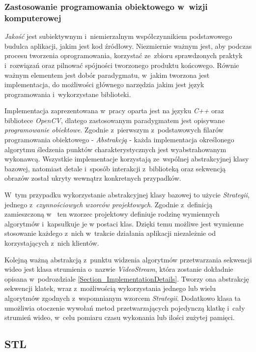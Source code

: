       \subsubsection{Zastosowanie programowania obiektowego w~wizji komputerowej}

        \textit{Jakość} jest subiektywnym i~niemierzalnym współczynnikiem podstawowego budulca aplikacji, jakim jest kod źródłowy. Niezmiernie ważnym jest, aby podczas procesu tworzenia oprogramowania, korzystać ze~zbioru sprawdzonych praktyk i~rozwiązań oraz pilnować spójności tworzonego produktu końcowego. Równie ważnym elementem jest dobór paradygmatu, w~jakim tworzona jest implementacja, do możliwości głównego narzędzia jakim jest język programowania i~wykorzystane biblioteki.

        Implementacja zaprezentowana w~pracy oparta jest na języku \textit{C++} oraz bibliotece \textit{OpenCV}, dlatego zastosowanym paradygmatem jest opisywane \textit{programowanie obiektowe}. Zgodnie z~pierwszym z~podstawowych filarów programowania obiektowego - \textit{Abstrakcją} - każda implementacja określonego algorytmu śledzenia punktów charakterystycznych jest wyabstrahowanym wykonawcą. Wszystkie implementacje korzystają ze~wspólnej abstrakcyjnej klasy bazowej, natomiast detale i~sposób interakcji z~biblioteką oraz sekwencją obrazów został ukryty wewnątrz konkretnych przypadków.

        W~tym przypadku wykorzystanie abstrakcyjnej klasy bazowej to użycie \textit{Strategii}, jednego z~\textit{czynnościowych wzorców projektowych}. Zgodnie z~definicją zamieszczoną w~\cite{PatternsGoF} ten wzorzec projektowy definiuje rodzinę wymiennych algorytmów i~kapsułkuje je w postaci klas. Dzięki temu możliwe jest wymienne stosowanie każdego z~nich w~trakcie działania aplikacji niezależnie od korzystających z~nich klientów.

        Kolejną ważną abstrakcją z~punktu widzenia algorytmów przetwarzania sekwencji wideo jest klasa strumienia o~nazwie \textit{VideoStream}, która zostanie dokładnie opisana w~podrozdziale \ref{Section_ImplementationDetails}. Tworzy ona abstrakcję sekwencji klatek, wraz z~możliwością wykorzystania jednego lub wielu algorytmów zgodnych z~wspomnianym wzorcem \textit{Strategii}. Dodatkowo klasa ta umożliwia otoczenie wywołań metod przetwarzających pojedynczą klatkę i~cały strumień wideo, w~celu pomiaru czasu wykonania lub ilości zużytej pamięci.

    \subsection{STL}\label{Subsection_STL}

